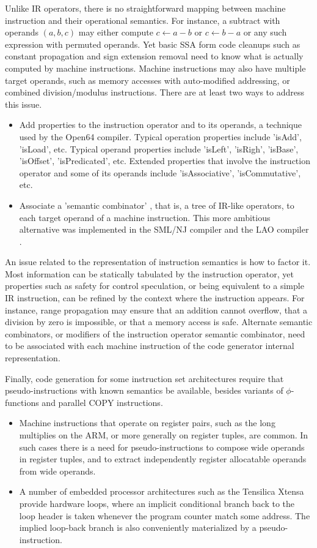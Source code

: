 Unlike IR operators, there is no straightforward mapping between machine
instruction and their operational semantics. For instance, a subtract
with operands $(a,b,c)$ may either compute $c \leftarrow a-b$ or $c
\leftarrow b-a$ or any such expression with permuted operands. Yet basic SSA
form code cleanups such as constant propagation and sign extension removal need
to know what is actually computed by machine instructions.  Machine instructions
may also have multiple target operands, such as memory accesses with
auto-modified addressing, or combined division/modulus instructions.
There are at least two ways to address this issue. \begin{itemize}
\item Add properties to the instruction operator and to its operands, a
technique used by the Open64 compiler. Typical operation properties include
'isAdd', 'isLoad', etc. Typical operand properties include 'isLeft', 'isRigh',
'isBase', 'isOffset', 'isPredicated', etc. Extended properties that involve the
instruction operator and some of its operands include 'isAssociative',
'isCommutative', etc.
\item Associate a 'semantic combinator' \cite{Leung:1999:PLDI}, that is, a tree
of IR-like operators, to each target operand of a machine instruction. This more
ambitious alternative was implemented in the SML/NJ \cite{Leung:1999:PLDI}
compiler and the LAO compiler \cite{Dinechin:2000:CASES}.  \end{itemize}

An issue related to the representation of instruction semantics is how to factor
it. Most information can be statically tabulated by the instruction operator, yet
properties such as safety for control speculation, or being equivalent to a
simple IR instruction, can be refined by the context where the instruction
appears. For instance, range propagation may ensure that an addition cannot
overflow, that a division by zero is impossible, or that a memory access is safe.
Alternate semantic combinators, or modifiers of the instruction operator semantic
combinator, need to be associated with each machine instruction of the code
generator internal representation.

Finally, code generation for some instruction set architectures require that
pseudo-instructions with known semantics be available, besides variants of
$\phi$-functions and parallel COPY instructions. \begin{itemize}
\item Machine instructions that
operate on register pairs, such as the long multiplies on the ARM, or more
generally on register tuples, are common. In such cases there is a need for
pseudo-instructions to compose wide operands in register tuples, and to extract
independently register allocatable operands from wide operands.
\item A number of embedded processor architectures such as the Tensilica Xtensa
provide hardware loops, where an implicit conditional branch back to the loop
header is taken whenever the program counter match some address. The implied
loop-back branch is also conveniently materialized by a pseudo-instruction.
\end{itemize}


